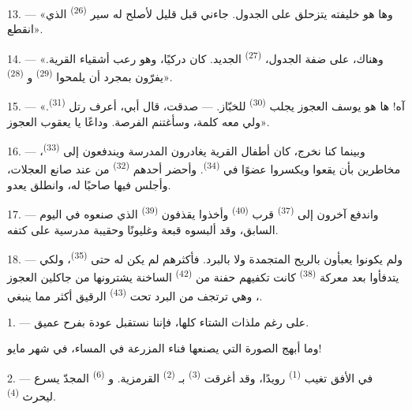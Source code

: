 13. --- «وها هو خليفته يتزحلق على الجدول. جاءني قبل قليل لأصلح له سير
 \textsuperscript{(26)} الذي انقطع».

14. --- «وهناك، على ضفة الجدول،  \textsuperscript{(27)}
الجديد. كان دركيًا، وهو رعب أشقياء القرية. يفرّون بمجرد أن يلمحوا
 \textsuperscript{(29)} و \textsuperscript{(28)}».

15. --- «آه! ها هو يوسف العجوز يجلب  \textsuperscript{(30)}
للخبّاز. --- صدقت، قال أبي، أعرف رتل  \textsuperscript{(31)}. ولي
معه كلمة، وسأغتنم الفرصة. وداعًا يا يعقوب العجوز».

16. --- وبينما كنا نخرج، كان أطفال القرية يغادرون المدرسة ويندفعون إلى
 \textsuperscript{(33)}، مخاطرين بأن يقعوا ويكسروا عضوًا في
 \textsuperscript{(34)}. وأحضر أحدهم 
\textsuperscript{(32)} من عند صانع العجلات، وأجلس فيها صاحبًا له، وانطلق يعدو.

17. --- واندفع آخرون إلى  \textsuperscript{(37)} قرب
 \textsuperscript{(40)} وأخذوا يقذفون 
\textsuperscript{(39)} الذي صنعوه في اليوم السابق، وقد ألبسوه قبعة وغليونًا
وحقيبة مدرسية على كتفه.

18. --- ولم يكونوا يعبأون بالريح المتجمدة ولا بالبرد. فأكثرهم لم يكن له
حتى  \textsuperscript{(35)}، ولكي يتدفأوا بعد معركة  \textsuperscript{(38)} كانت تكفيهم حفنة من 
\textsuperscript{(42)} الساخنة يشترونها من جاكلين العجوز ، وهي
ترتجف من البرد تحت  \textsuperscript{(43)} الرقيق أكثر مما ينبغي.

\VUsaut{3.0mm}
\VUsaut{3.0mm}

\VUsaut{4.0mm}

1. --- على رغم ملذات الشتاء كلها، فإننا نستقبل عودة  بفرح
عميق.

وما أبهج الصورة التي يصنعها فناء المزرعة في المساء، في شهر مايو!

2. --- في الأفق تغيب  \textsuperscript{(1)} رويدًا، وقد أغرقت
 \textsuperscript{(3)} بـ \textsuperscript{(2)} القرمزية.
و \textsuperscript{(6)} المجدّ يسرع ليحرث 
\textsuperscript{(4)}.

